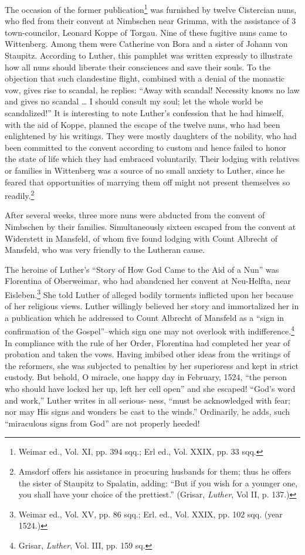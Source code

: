 The occasion of the former publication\footnote
{Weimar ed., Vol. XI, pp. 394 sqq.; Erl ed., Vol. XXIX, pp. 33 sqq.}
was furnished by twelve
Cistercian nuns, who fled from their convent at Nimbschen near
Grimma, with the assistance of 3 town-councilor, Leonard Koppe of
Torgau. Nine of these fugitive nuns came to Wittenberg. Among
them were Catherine von Bora and a sister of Johann von Staupitz.
According to Luther, this pamphlet was written expressly to illustrate
how all nuns should liberate their consciences and save their
souls. To the objection that such clandestine flight, combined with
a denial of the monastic vow, gives rise to scandal, he replies: “Away
with scandal! Necessity knows no law and gives no scandal \dots
I should consult my soul; let the whole world be scandalized!” It
is interesting to note Luther’s confession that he had himself, with
the aid of Koppe, planned the escape of the twelve nuns, who had
been enlightened by his writings. They were mostly daughters of
the nobility, who had been committed to the convent according to
custom and hence failed to honor the state of life which they had
embraced voluntarily. Their lodging with relatives or families in
Wittenberg was a source of no small anxiety to Luther, since he
feared that opportunities of marrying them off might not present
themselves so readily.\footnote
{Amsdorf offers his assistance in procuring husbands for them; thus he offers the sister
of Staupitz to Spalatin, adding: “But if you wish for a younger one, you shall have your
choice of the prettiest.” (Grisar, \textit{Luther}, Vol II, p. 137.)}


After several weeks, three more nuns were abducted from the
convent of Nimbschen by their families. Simultaneously sixteen
escaped from the convent at Widerstett in Mansfeld, of whom five
found lodging with Count Albrecht of Mansfeld, who was very
friendly to the Lutheran cause.

The heroine of Luther’s “Story of How God Came to the Aid of
a Nun” was Florentina of Oberweimar, who had abandcned her
convent at Neu-Helfta, near Eisleben.\footnote{Weimar ed., Vol. XV, pp. 86 sqq.; Erl. ed., Vol. XXIX, pp. 102 sqq. (year 1524.)}
She told Luther of alleged
bodily torments inflicted upon her because of her religious views.
Luther willingly believed her story and immortalized her in a publication
which he addressed to Count Albrecht of Mansfeld as a “sign
in confirmation of the Gospel”--which sign one may not overlook
with indifference.\footnote{Grisar, \textit{Luther}, Vol. III, pp. 159 sq.}
In compliance with the rule of her Order,
Florentina had completed her year of probation and taken the vows.
Having imbibed other ideas from the writings of the reformers,
she was subjected to penalties by her superioress and kept in strict
custody. But behold, O miracle, one happy day in February, 1524,
“the person who should have locked her up, left her cell open” and
she escaped! “God’s word and work,” Luther writes in all serious-
ness, “must be acknowledged with fear; nor may His signs and
wonders be cast to the winds.” Ordinarily, he adds, such “miraculous
signs from God” are not properly heeded!

